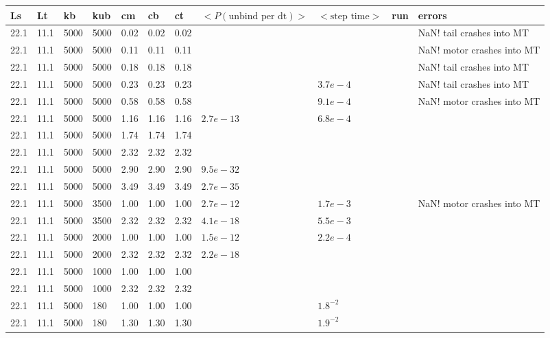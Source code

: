 \documentclass[10pt]{article} %
\begin{document}
\begin{center}
  \begin{tabular}{| l | l | l | l | l | l | l | p{3cm} | p{2cm} | l | p{5cm} |}
    \hline
    Ls & Lt & kb & kub & cm & cb & ct & $\Big<P(\mbox{unbind per dt})\Big>$ & $\Big<\mbox{step time}\Big>$ & run & errors\\\hline
    22.1 & 11.1 & 5000 & 5000 & 0.02 & 0.02 & 0.02 & & & & NaN! tail crashes into MT \\\hline
    22.1 & 11.1 & 5000 & 5000 & 0.11 & 0.11 & 0.11 & & & & NaN! motor crashes into MT \\\hline
    22.1 & 11.1 & 5000 & 5000 & 0.18 & 0.18 & 0.18 & & & & NaN! tail crashes into MT \\\hline
    22.1 & 11.1 & 5000 & 5000 & 0.23 & 0.23 & 0.23 & & $3.7e-4$ & & NaN! tail crashes into MT \\\hline
    22.1 & 11.1 & 5000 & 5000 & 0.58 & 0.58 & 0.58 & & $9.1e-4$ & & NaN! motor crashes into MT \\\hline
    22.1 & 11.1 & 5000 & 5000 & 1.16 & 1.16 & 1.16 & $2.7e-13$ & $6.8e-4$ & & \\\hline
    22.1 & 11.1 & 5000 & 5000 & 1.74 & 1.74 & 1.74 & & & & \\\hline
    22.1 & 11.1 & 5000 & 5000 & 2.32 & 2.32 & 2.32 & & & & \\\hline
    22.1 & 11.1 & 5000 & 5000 & 2.90 & 2.90 & 2.90 & $9.5e-32$ & & & \\\hline
    22.1 & 11.1 & 5000 & 5000 & 3.49 & 3.49 & 3.49 & $2.7e-35$ & & & \\\hline
    22.1 & 11.1 & 5000 & 3500 & 1.00 & 1.00 & 1.00 & $2.7e-12$ & $1.7e-3$ & & NaN! motor crashes into MT\\\hline
    22.1 & 11.1 & 5000 & 3500 & 2.32 & 2.32 & 2.32 & $4.1e-18$ & $5.5e-3$ & & \\\hline
    22.1 & 11.1 & 5000 & 2000 & 1.00 & 1.00 & 1.00 & $1.5e-12$ & $2.2e-4$ & & \\\hline
    22.1 & 11.1 & 5000 & 2000 & 2.32 & 2.32 & 2.32 & $2.2e-18$ & & & \\\hline
    22.1 & 11.1 & 5000 & 1000 & 1.00 & 1.00 & 1.00 & & & & \\\hline
    22.1 & 11.1 & 5000 & 1000 & 2.32 & 2.32 & 2.32 & & & & \\\hline
    22.1 & 11.1 & 5000 &  180 & 1.00 & 1.00 & 1.00 & & $1.8^{-2}$ & & \\\hline
    22.1 & 11.1 & 5000 &  180 & 1.30 & 1.30 & 1.30 & & $1.9^{-2}$ & & \\\hline

\end{tabular}
\end{center}
\end{document}
